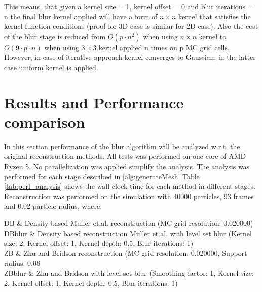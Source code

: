 This means, that given a kernel size = 1, kernel offset = 0 and blur iterations = n the final blur kernel applied will have a form of $ n \times n$ kernel that satisfies the kernel function conditions (proof for 3D case is similar for 2D case). Also the cost of the blur stage is reduced from $O(p \cdot n^2)$ when using $n \times n$ kernel to $O(9 \cdot p \cdot n)$ when using $3\times 3$ kernel applied n times on p MC grid cells. However, in  case of iterative approach kernel converges to Gaussian, in the latter case uniform kernel is applied. 


\section{Results and Performance comparison}
In this section performance of the blur algorithm will be analyzed w.r.t. the original reconstruction methods. All tests was performed on one core of AMD Ryzen 5. No parallelization was applied simplify the analysis. The analysis was performed for each stage described in \ref{alg:generateMesh} 
Table \ref{tab:perf_analysis} shows the wall-clock time for each method in different stages.
Reconstruction was performed on the simulation with 40000 particles, 93 frames and 0.02 particle radius, where:
\begin{conditions}
	DB & Density based Muller et.al. reconstruction (MC grid resolution: 0.020000)\\
	DBblur & Density based reconstruction Muller et.al. with level set blur (Kernel size: 2, Kernel offset: 1, Kernel depth: 0.5, Blur iterations: 1)\\
	ZB & Zhu and Bridson reconstruction (MC grid resolution: 0.020000, Support radius: 0.08\\
	ZBblur & Zhu and Bridson with level set blur (Smoothing factor: 1, Kernel size: 2, Kernel offset: 1, Kernel depth: 0.5, Blur iterations: 1)\\
\end{conditions}
